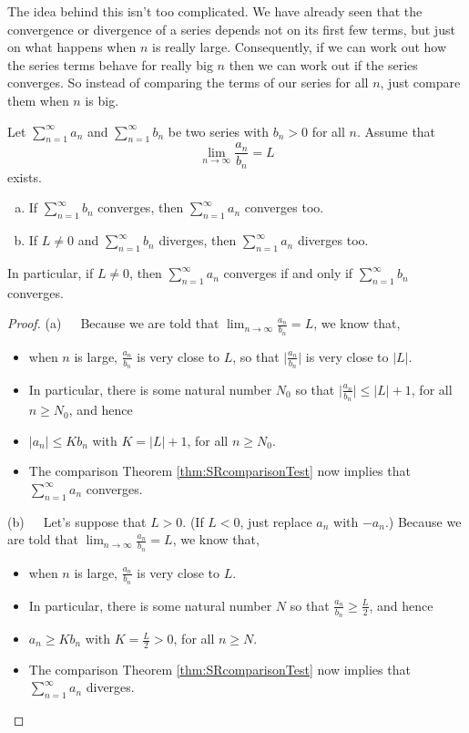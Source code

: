 The idea behind this isn't too complicated. We have already seen
that the convergence or divergence of a series depends not on its
first few terms, but just on what happens when $n$ is really large.
Consequently, if we can work out how  the series terms behave for
really big $n$ then we can work out if the series converges.
So instead of comparing the terms of our series for all $n$, just
compare them when $n$ is big.
\begin{theorem}\label{thm:SRlimitComparison}
Let $\sum_{n=1}^\infty a_n$ and $\sum_{n=1}^\infty b_n$ be two series with
$b_n>0$ for all $n$. Assume that
\begin{equation*}
\lim_{n\rightarrow\infty}\frac{a_n}{b_n}=L
\end{equation*}
exists.
\begin{enumerate}[(a)]
\item If $\sum_{n=1}^\infty b_n$  converges, then
$\sum_{n=1}^\infty a_n$ converges too.

\item If $L\ne 0$ and $\sum_{n=1}^\infty b_n$  diverges,
then $\sum_{n=1}^\infty a_n$ diverges too.
\end{enumerate}
In particular, if $L\ne 0$, then $\sum_{n=1}^\infty a_n$ converges
if and only if $\sum_{n=1}^\infty b_n$ converges.

\end{theorem}

\begin{proof} (a)\ \ \
Because we are told that
$
\lim_{n\rightarrow\infty}\frac{a_n}{b_n}=L
$,
we know that,
\begin{itemize}
\item
when $n$ is large,  $\frac{a_n}{b_n}$ is very close to $L$,
so that $\Big|\frac{a_n}{b_n}\Big|$ is very close to $|L|$.
\item
In particular, there is some natural number $N_0$ so that
$\Big|\frac{a_n}{b_n}\Big|\le |L|+1$, for all $n\ge N_0$, and hence
\item
$|a_n|\le Kb_n$ with $K=|L|+1$, for all $n\ge N_0$.
\item
The comparison Theorem \ref{thm:SRcomparisonTest}
now implies that $\sum_{n=1}^\infty a_n$ converges.
\end{itemize}


\noindent (b)\ \ \
 Let's suppose that $L>0$. (If $L<0$, just replace $a_n$
with $-a_n$.) Because we are told that
$
\lim_{n\rightarrow\infty}\frac{a_n}{b_n}=L
$,
we know that,
\begin{itemize}
\item
when $n$ is large,  $\frac{a_n}{b_n}$ is very close to $L$.
\item
In particular, there is some natural number $N$ so that
$\frac{a_n}{b_n}\ge \frac{L}{2}$, and hence
\item
$a_n\ge Kb_n$ with $K=\frac{L}{2}>0$, for all $n\ge N$.
\item
The comparison Theorem \ref{thm:SRcomparisonTest}
now implies that $\sum_{n=1}^\infty a_n$ diverges.
\end{itemize}
\end{proof}

